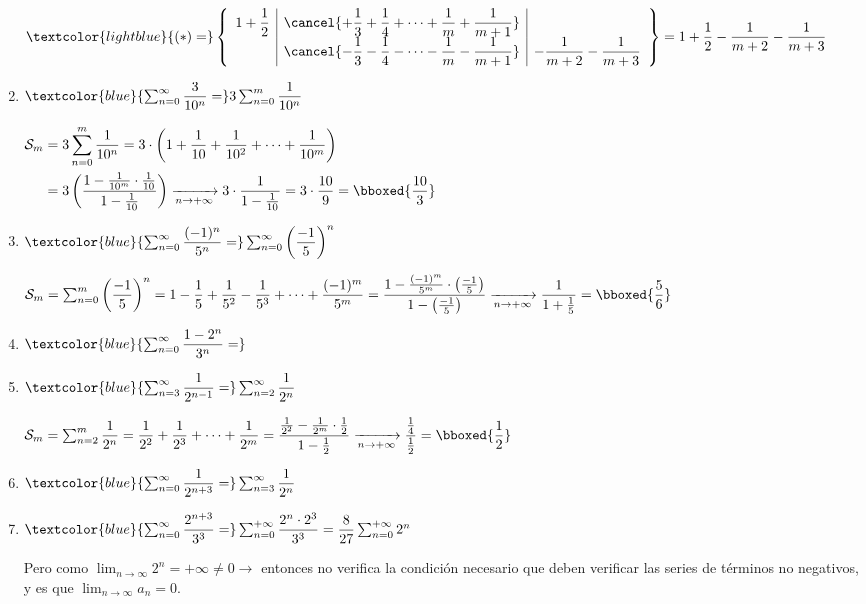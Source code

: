 \begin{enumerate}[label=\color{red}\alph*)]
	$\textcolor{lightblue}{(\ast)=}\left\{\begin{array}{r|c|l}
		1+\dfrac{1}{2} & \cancel{+\dfrac{1}{3}+\dfrac{1}{4}+\cdots+\dfrac{1}{m}+\dfrac{1}{m+1}} & \\
		& \cancel{-\dfrac{1}{3}-\dfrac{1}{4}-\cdots-\dfrac{1}{m}-\dfrac{1}{m+1}}&-\dfrac{1}{m+2}-\dfrac{1}{m+3}
	\end{array}\right\}=1+\dfrac{1}{2}-\dfrac{1}{m+2}-\dfrac{1}{m+3}$
	\item $\textcolor{blue}{\sum_{n=0}^{\infty}\dfrac{3}{10^n}=}3\sum_{n=0}^{m}\dfrac{1}{10^n}$
	
	$\begin{aligned}
		\mathcal{S}_m&=3\sum_{n=0}^{m}\dfrac{1}{10^n}=3\cdot\left(1+\dfrac{1}{10}+\dfrac{1}{10^2}+\cdots+\dfrac{1}{10^m}\right)\\
		&=3\left(\dfrac{1-\frac{1}{10^m}\cdot\frac{1}{10}}{1-\frac{1}{10}}\right)\xrightarrow[n\to+\infty]{}3\cdot\dfrac{1}{1-\frac{1}{10}}=3\cdot\dfrac{10}{9}=\bboxed{\dfrac{10}{3}}
	\end{aligned}$
	
	\item $\textcolor{blue}{\sum_{n=0}^{\infty}\dfrac{(-1)^n}{5^n}=}\sum_{n=0}^{\infty}\left(\dfrac{-1}{5}\right)^n$
	
	$\mathcal{S}_m=\sum_{n=0}^{m}\left(\dfrac{-1}{5}\right)^n=1-\dfrac{1}{5}+\dfrac{1}{5^2}-\dfrac{1}{5^3}+\cdots+\dfrac{(-1)^m}{5^m}=\dfrac{1-\frac{(-1)^m}{5^m}\cdot\left(\frac{-1}{5}\right)}{1-\left(\frac{-1}{5}\right)}\xrightarrow[n\to+\infty]{}\dfrac{1}{1+\frac{1}{5}}=\bboxed{\dfrac{5}{6}}$
	
	\item $\textcolor{blue}{\sum_{n=0}^{\infty}\dfrac{1-2^n}{3^n}=}$
	\item $\textcolor{blue}{\sum_{n=3}^{\infty}\dfrac{1}{2^{n-1}}=}\sum_{n=2}^{\infty}\dfrac{1}{2^n}$
	
	$\mathcal{S}_m=\sum_{n=2}^{m}\dfrac{1}{2^n}=\dfrac{1}{2^2}+\dfrac{1}{2^3}+\cdots+\dfrac{1}{2^m}=\dfrac{\frac{1}{2^2}-\frac{1}{2^m}\cdot\frac{1}{2}}{1-\frac{1}{2}}\xrightarrow[n\to+\infty]{}\dfrac{\frac{1}{4}}{\frac{1}{2}}=\bboxed{\dfrac{1}{2}}$
	\item $\textcolor{blue}{\sum_{n=0}^{\infty}\dfrac{1}{2^{n+3}}=}\sum_{n=3}^{\infty}\dfrac{1}{2^n}$
	\item $\textcolor{blue}{\sum_{n=0}^{\infty}\dfrac{2^{n+3}}{3^3}=}\sum_{n=0}^{+\infty}\dfrac{2^n\cdot2^3}{3^3}=\dfrac{8}{27}\sum_{n=0}^{+\infty}2^n$
    
    Pero como $\lim_{n\to\infty}2^n=+\infty\neq0\longrightarrow$ entonces no verifica la condición necesario que deben verificar las series de términos no negativos, y es que $\lim_{n\to\infty}a_n=0$.
   

\end{enumerate}
